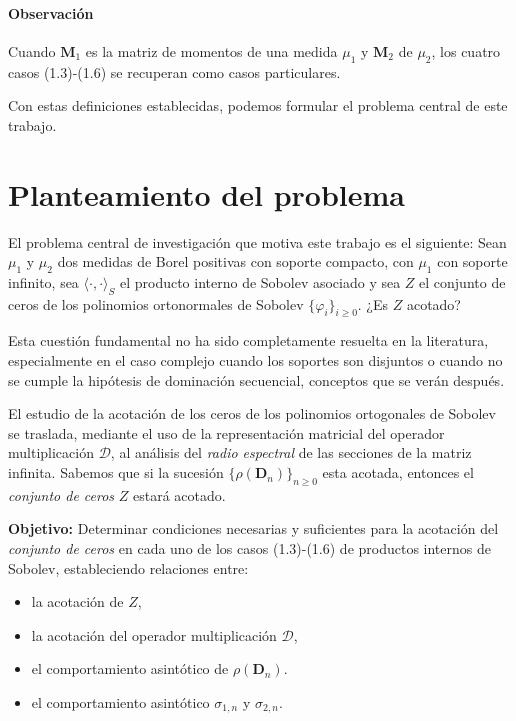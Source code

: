 \paragraph{Observación}
Cuando \(\mathbf{M}_{1}\) es la matriz de momentos de una medida \(\mu_{1}\) y
\(\mathbf{M}_{2}\) de \(\mu_{2}\), los cuatro casos (1.3)-(1.6) se recuperan como casos particulares.

Con estas definiciones establecidas, podemos formular el problema central de este trabajo.

\section{Planteamiento del problema}

El problema central de investigación que motiva este trabajo es el siguiente: Sean $\mu_1$ y $\mu_2$ dos medidas de Borel positivas con soporte compacto, con $\mu_1$ con soporte infinito, sea $\langle\cdot,\cdot\rangle_S$ el producto interno de Sobolev asociado y sea $Z$ el conjunto de ceros de los polinomios ortonormales de Sobolev $\{\varphi_i\}_{i\ge 0}$. ¿Es $Z$ acotado?

Esta cuestión fundamental no ha sido completamente resuelta en la literatura, especialmente en el caso complejo cuando los soportes son disjuntos o cuando no se cumple la hipótesis de dominación secuencial, conceptos que se verán después.

El estudio de la acotación de los ceros de los polinomios ortogonales de Sobolev se
traslada, mediante el uso de la representación matricial del
operador multiplicación $\mathcal{D}$, al análisis del \emph{radio espectral} de las secciones de la matriz infinita. Sabemos que si la sucesión \(\{\rho(\mathbf{D}_{n})\}_{n\ge0}\) esta acotada, entonces el \emph{conjunto de ceros}
\(Z\) estará acotado.

\textbf{Objetivo: }
Determinar condiciones necesarias y suficientes para la acotación del \emph{conjunto de ceros} en cada uno de los casos (1.3)-(1.6) de productos internos de Sobolev, estableciendo relaciones entre:
\begin{itemize}
	\item la acotación de $Z$,
	\item la acotación del operador multiplicación $\mathcal{D}$,
	\item el comportamiento asintótico de $\rho(\mathbf{D}_{n})$.
	\item el comportamiento asintótico $\sigma_{1,n}$ y $\sigma_{2,n}$.
\end{itemize}

